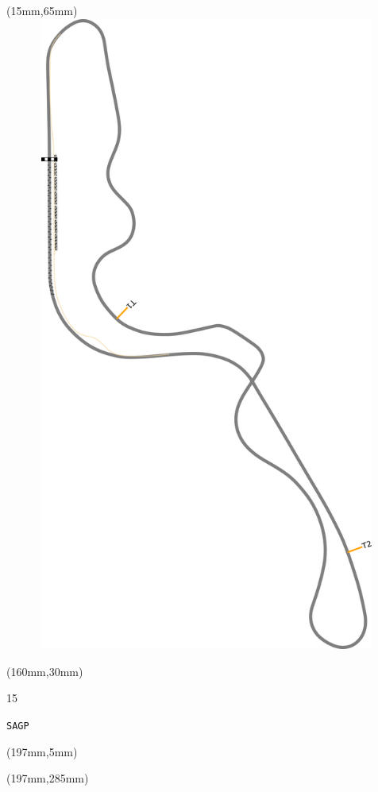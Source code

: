 \begin{textblock*}{185mm}(15mm,65mm)%
\centering
\mbox{\includegraphics[width=185mm,height=210mm,keepaspectratio]{PT/SAGP.pdf}}
\end{textblock*}
\begin{textblock*}{40mm}(160mm,30mm)%
\Large
\par{} 
\par15 
\par\hfill\tiny\tt SAGP\\
\end{textblock*}
\begin{textblock*}{20mm}(197mm,5mm)%
\fbox{\thepage}
\label{SAGP}
\end{textblock*}
\begin{textblock*}{20mm}(197mm,285mm)%
\fbox{\thepage}
\end{textblock*}

